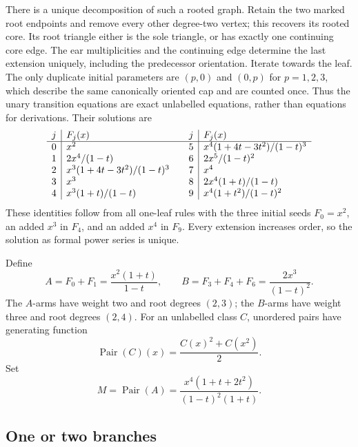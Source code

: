 There is a unique decomposition of such a rooted graph.  Retain
the two marked root endpoints and remove every other degree-two
vertex; this recovers its rooted core.  Its root triangle either
is the sole triangle, or has exactly one continuing core edge.
The ear multiplicities and the continuing edge determine the
last extension uniquely, including the predecessor orientation.
Iterate towards the leaf.  The only duplicate initial parameters
are $(p,0)$ and $(0,p)$ for $p=1,2,3$, which describe the same
canonically oriented cap and are counted once.  Thus the unary
transition equations are exact unlabelled equations, rather than
equations for derivations.  Their solutions are
\[
\begin{array}{c|l@{\qquad}c|l}
j&F_j(x)&j&F_j(x)\\ \hline
0&x^2&5&x^4(1+4t-3t^2)/(1-t)^3\\
1&2x^4/(1-t)&6&2x^5/(1-t)^2\\
2&x^3(1+4t-3t^2)/(1-t)^3&7&x^4\\
3&x^3&8&2x^4(1+t)/(1-t)\\
4&x^3(1+t)/(1-t)&9&x^4(1+t^2)/(1-t)^2
\end{array}
\]
These identities follow from all one-leaf rules with the three
initial seeds $F_0=x^2$, an added $x^3$ in $F_4$, and an added
$x^4$ in $F_9$.  Every extension increases order, so the solution
as formal power series is unique.

Define
\[
 A=F_0+F_1=\frac{x^2(1+t)}{1-t},\qquad
 B=F_3+F_4+F_6=\frac{2x^3}{(1-t)^2}.
\]
The $A$-arms have weight two and root degrees $(2,3)$; the
$B$-arms have weight three and root degrees $(2,4)$.  For an
unlabelled class $C$, unordered pairs have generating function
\[
 \operatorname{Pair}(C)(x)=\frac{C(x)^2+C(x^2)}2.
\]
Set
\[
 M=\operatorname{Pair}(A)
   =\frac{x^4(1+t+2t^2)}{(1-t)^2(1+t)}.
\]

\subsection{One or two branches}


